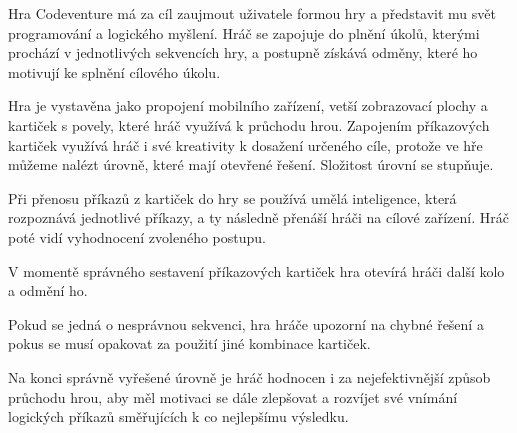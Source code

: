 Hra Codeventure má za cíl zaujmout uživatele formou hry a představit mu svět programování a logického myšlení. Hráč se zapojuje do plnění úkolů, kterými prochází v jednotlivých sekvencích hry, a postupně získává odměny, které ho motivují ke splnění cílového úkolu.\par
Hra je vystavěna jako propojení mobilního zařízení, vetší zobrazovací plochy a kartiček s povely, které hráč využívá k průchodu hrou. Zapojením příkazových kartiček využívá hráč i své kreativity k dosažení určeného cíle, protože ve hře můžeme nalézt úrovně, které mají otevřené řešení. Složitost úrovní se stupňuje.\par
Při přenosu příkazů z kartiček do hry se používá umělá inteligence, která rozpoznává jednotlivé příkazy, a ty následně přenáší hráči na cílové zařízení. Hráč poté vidí vyhodnocení zvoleného postupu.\par
V momentě správného sestavení příkazových kartiček hra otevírá hráči další kolo a odmění ho.\par
Pokud se jedná o nesprávnou sekvenci, hra hráče upozorní na chybné řešení a pokus se musí opakovat za použití jiné kombinace kartiček.\par
Na konci správně vyřešené úrovně je hráč hodnocen i za nejefektivnější způsob průchodu hrou, aby měl motivaci se dále zlepšovat a rozvíjet své vnímání logických příkazů směřujících k co nejlepšímu výsledku.